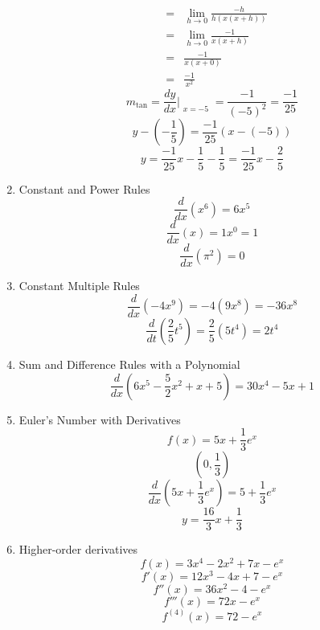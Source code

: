 \documentclass{article}
\begin{document}
\begin{enumerate}
\begin{eqnarray}
                      &=& \lim_{h \to 0}{\frac{-h}{h(x(x + h))}} \\
                      &=& \lim_{h \to 0}{\frac{-1}{x(x + h)}} \\
                      &=& \frac{-1}{x(x + 0)} \\
                      &=& \frac{-1}{x^2}
    \end{eqnarray}
    $$m_{\tan} = \frac{dy}{dx}\Bigr|_{\substack{x=-5}} = \frac{-1}{(-5)^2} = \frac{-1}{25}$$
    $$y - (- \frac{1}{5}) = \frac{-1}{25}(x - (-5))$$
    $$y = \frac{-1}{25}x - \frac{1}{5} - \frac{1}{5} = \frac{-1}{25}x - \frac{2}{5}$$
    \item Constant and Power Rules
    $$\frac{d}{dx}\left(x^6\right) = 6x^5$$
    $$\frac{d}{dx}\left(x\right) = 1x^0 = 1$$
    $$\frac{d}{dx}\left(\pi^2\right) = 0$$
    \item Constant Multiple Rules
    $$\frac{d}{dx}\left(-4x^9\right) = -4\left(9x^8\right) = -36x^8$$
    $$\frac{d}{dt}\left(\frac{2}{5}t^5\right) = \frac{2}{5}\left(5t^4\right) = 2t^4$$
    \item Sum and Difference Rules with a Polynomial
    $$\frac{d}{dx}\left(6x^5 - \frac{5}{2}x^2 + x + 5\right) = 30x^4 - 5x + 1$$
    \item Euler's Number with Derivatives
    $$f(x) = 5x + \frac{1}{3}e^x$$
    $$\left(0, \frac{1}{3}\right)$$
    $$\frac{d}{dx}\left(5x + \frac{1}{3}e^x\right) = 5 + \frac{1}{3}e^x$$
    $$y = \frac{16}{3}x + \frac{1}{3}$$
    \item Higher-order derivatives
    $$f(x) = 3x^4 - 2x^2 + 7x - e^x$$
    $$f'(x) = 12x^3 - 4x + 7 - e^x$$
    $$f''(x) = 36x^2 - 4 - e^x$$
    $$f'''(x) = 72x - e^x$$
    $$f^{(4)}(x) = 72 - e^x$$
\end{enumerate}
\end{document}
